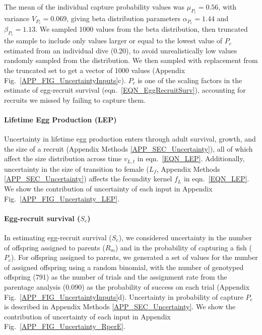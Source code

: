 \documentclass[12pt, oneside]{article}   	%
\begin{document}
The mean of the individual capture probability values was $\mu_{P_c} = 0.56$, with variance $V_{P_c} = 0.069$, giving beta distribution parameters $\alpha_{P_c} = 1.44$ and $\beta_{P_c} = 1.13$. We sampled 1000 values from the beta distribution, then truncated the sample to include only values larger or equal to the lowest value of $P_c$ estimated from an individual dive (0.20), to avoid unrealistically low values randomly sampled from the distribution. We then sampled with replacement from the truncated set to get a vector of 1000 values (Appendix Fig.\ \ref{APP_FIG_UncertaintyInputs}c). $P_c$ is one of the scaling factors in the estimate of egg-recruit survival (eqn.\ \ref{EQN_EggRecruitSurv}), accounting for recruits we missed by failing to capture them.

\paragraph*{Lifetime Egg Production (LEP)} %

Uncertainty in lifetime egg production enters through adult survival, growth, and the size of a recruit (Appendix Methods \ref{APP_SEC_Uncertainty}), all of which affect the size distribution across time $v_{L,t}$ in eqn.\ \ref{EQN_LEP}. Additionally, uncertainty in the size of transition to female ($L_f$, Appendix Methods \ref{APP_SEC_Uncertainty}) affects the fecundity kernel $f_L$ in eqn.\ \ref{EQN_LEP}. We show the contribution of uncertainty of each input in Appendix Fig.\ \ref{APP_FIG_Uncertainty_LEP}.

\paragraph*{Egg-recruit survival ($S_e$)} %

In estimating egg-recruit survival ($S_e$), we considered uncertainty in the number of offspring assigned to parents ($R_m$) and in the probability of capturing a fish ($P_c$). For offspring assigned to parents, we generated a set of values for the number of assigned offspring using a random binomial, with the number of genotyped offspring (791) as the number of trials and the assignment rate from the parentage analysis (0.090) as the probability of success on each trial \citep{catalanoInPrepconnectivity} (Appendix Fig.\ \ref{APP_FIG_UncertaintyInputs}d). Uncertainty in probability of capture $P_c$ is described in Appendix Methods \ref{APP_SEC_Uncertainty}. We show the contribution of uncertainty of each input in Appendix Fig.\ \ref{APP_FIG_Uncertainty_RperE}.
\end{document}
